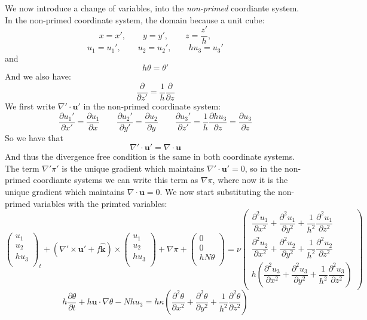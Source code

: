 \documentclass[12pt]{article}
\newcommand{\khat}{\hat{\mathbf k}}
\newcommand{\uv}{\mathbf u}
\newcommand{\up}{\mathbf u'}
\newcommand{\grad}{\nabla}
\newcommand{\curlp}{\gradp \times}
\newcommand{\gradp}{\nabla'}
\begin{document}
We now introduce a change of variables, into the {\em non-primed} coordiante
system.  In the non-primed coordinate system, the domain because a 
unit cube:
\[
x = x', \qquad y=y', \qquad  z = \frac{z'}{h},
\]
\[
u_1 = u_1', \qquad u_2 = u_2', \qquad  h u_3 = u_3'
\]
and
\[
h \theta = \theta'
\]
And we also have:
\[
\frac{\partial}{\partial z'} = \frac{1}{h} \frac{\partial}{\partial z}
\]
We first write $\gradp \cdot \up$ in the non-primed coordinate system:
\[
\frac{\partial u_1' }{\partial x'} = \frac{\partial u_1 }{\partial x}
\qquad
\frac{\partial u_2' }{\partial y'} = \frac{\partial u_2 }{\partial y}
\qquad
\frac{\partial u_3' }{\partial z'} = \frac{1}{h} \frac{\partial h u_3 }{\partial z}
= \frac{\partial u_3 }{\partial z}
\]
So we have that
\[
\gradp \cdot \up = \grad \cdot \uv
\]
And thus the divergence free condition is the 
same in both coordinate systems.  The term $\gradp \pi'$ is the
unique gradient which maintains $\gradp \cdot \up = 0$, so in the
non-primed coordiante systems we can write this term as 
$\grad \pi$, where now it is the unique gradient which maintains 
$\grad \cdot \uv = 0$.
We now start substituting the non-primed variables with the
primted variables:
\[
\begin{pmatrix} u_1 \\
                u_2 \\
                h u_3 \\
\end{pmatrix}_t
  + (\curlp \up + f \khat) \times 
\begin{pmatrix} u_1 \\
                u_2 \\
                h u_3 \\
\end{pmatrix}
+ \grad \pi +
\begin{pmatrix} 0 \\
                0 \\
                h N \theta \\
\end{pmatrix}
= \nu 
\begin{pmatrix} \dfrac{\partial^2 u_1}{\partial x^2} + 
                \dfrac{\partial^2 u_1}{\partial y^2} + 
                \dfrac{1}{h^2}\dfrac{\partial^2 u_1}{\partial z^2}   \\[5mm]
                \dfrac{\partial^2 u_2}{\partial x^2} + 
                \dfrac{\partial^2 u_2}{\partial y^2} + 
                \dfrac{1}{h^2}\dfrac{\partial^2 u_2}{\partial z^2}   \\[5mm]
                h \left( 
                \dfrac{\partial^2 u_3}{\partial x^2} + 
                \dfrac{\partial^2 u_3}{\partial y^2} + 
                \dfrac{1}{h^2}\dfrac{\partial^2 u_3}{\partial z^2} \right)
\end{pmatrix}
\]
\[
h \frac{ \partial  \theta }{\partial t}  + h \uv \cdot \grad \theta - 
N h u_3  = h \kappa \left(
                \dfrac{\partial^2 \theta}{\partial x^2} + 
                \dfrac{\partial^2 \theta}{\partial y^2} + 
                \dfrac{1}{h^2}\dfrac{\partial^2 \theta}{\partial z^2}
\right)
\]
\end{document}
